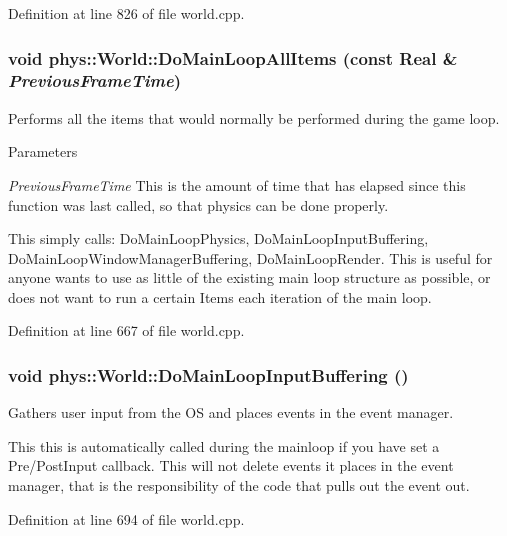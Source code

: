 Definition at line 826 of file world.cpp.

\hypertarget{classphys_1_1World_a25c2583425bfe3d0d2bfce1093f0175e}{
\subsubsection[{DoMainLoopAllItems}]{\setlength{\rightskip}{0pt plus 5cm}void phys::World::DoMainLoopAllItems (const {\bf Real} \& {\em PreviousFrameTime})}}
\label{da/ddf/classphys_1_1World_a25c2583425bfe3d0d2bfce1093f0175e}


Performs all the items that would normally be performed during the game loop. 


\begin{DoxyParams}{Parameters}
\item[{\em PreviousFrameTime}]This is the amount of time that has elapsed since this function was last called, so that physics can be done properly.\end{DoxyParams}
This simply calls: DoMainLoopPhysics, DoMainLoopInputBuffering, DoMainLoopWindowManagerBuffering, DoMainLoopRender. This is useful for anyone wants to use as little of the existing main loop structure as possible, or does not want to run a certain Items each iteration of the main loop. 

Definition at line 667 of file world.cpp.

\hypertarget{classphys_1_1World_af4204b587fcc71e8313dd97d476378d6}{
\subsubsection[{DoMainLoopInputBuffering}]{\setlength{\rightskip}{0pt plus 5cm}void phys::World::DoMainLoopInputBuffering ()}}
\label{da/ddf/classphys_1_1World_af4204b587fcc71e8313dd97d476378d6}


Gathers user input from the OS and places events in the event manager. 

This this is automatically called during the mainloop if you have set a Pre/PostInput callback. This will not delete events it places in the event manager, that is the responsibility of the code that pulls out the event out. 

Definition at line 694 of file world.cpp.

